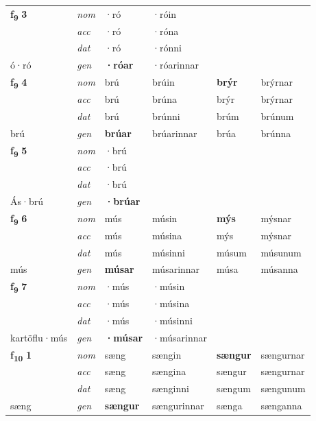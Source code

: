 \begin{longtable}[l]{X>{\footnotesize\itshape}XXXXX}
\multirow{3}{*}{{{\textbf{f{\textsubscript{9}}} \Large{\textbf{3}}}}} & nom & ·ró & ·róin & \textbf{} &  \\*
 & acc & ·ró & ·róna &  &  \\*
 & dat & ·ró & ·rónni &  &  \\*
 {\footnotesize{ó\allowbreak ·ró}} & gen & \textbf{·róar} & ·róarinnar &  &  \\
\midrule

\multirow{3}{*}{{{\textbf{f{\textsubscript{9}}} \Large{\textbf{4}}}}} & nom & brú & brúin & \textbf{brýr} & brýrnar \\*
 & acc & brú & brúna & brýr & brýrnar \\*
 & dat & brú & brúnni & brúm & brúnum \\*
 {\footnotesize{brú}} & gen & \textbf{brúar} & brúarinnar & brúa & brúnna \\
\midrule

\multirow{3}{*}{{{\textbf{f{\textsubscript{9}}} \Large{\textbf{5}}}}} & nom & ·brú &  & \textbf{} &  \\*
 & acc & ·brú &  &  &  \\*
 & dat & ·brú &  &  &  \\*
 {\footnotesize{Ás\allowbreak ·brú}} & gen & \textbf{·brúar} &  &  &  \\
\midrule

\multirow{3}{*}{{{\textbf{f{\textsubscript{9}}} \Large{\textbf{6}}}}} & nom & mús & músin & \textbf{mýs} & mýsnar \\*
 & acc & mús & músina & mýs & mýsnar \\*
 & dat & mús & músinni & músum & músunum \\*
 {\footnotesize{mús}} & gen & \textbf{músar} & músarinnar & músa & músanna \\
\midrule

\multirow{3}{*}{{{\textbf{f{\textsubscript{9}}} \Large{\textbf{7}}}}} & nom & ·mús & ·músin & \textbf{} &  \\*
 & acc & ·mús & ·músina &  &  \\*
 & dat & ·mús & ·músinni &  &  \\*
 {\footnotesize{kartöflu\allowbreak ·mús}} & gen & \textbf{·músar} & ·músarinnar &  &  \\
\midrule

\multirow{3}{*}{{{\textbf{f{\textsubscript{10}}} \Large{\textbf{1}}}}} & nom & sæng & sængin & \textbf{sængur} & sængurnar \\*
 & acc & sæng & sængina & sængur & sængurnar \\*
 & dat & sæng & sænginni & sængum & sængunum \\*
 {\footnotesize{sæng}} & gen & \textbf{sængur} & sængurinnar & sænga & sænganna \\
\midrule


\end{longtable}
